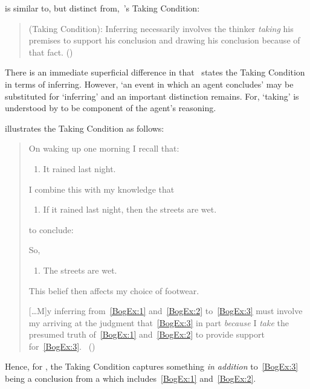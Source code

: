 \begin{note}
 \supportI{} is similar to, but distinct from,~\citeauthor{Boghossian:2014aa}'s Taking Condition:

  \begin{quote}
    (Taking Condition):
    Inferring necessarily involves the thinker \emph{taking} his premises to support his conclusion and drawing his conclusion because of that fact.%
    \mbox{}\hfill\mbox{(\citeyear[5]{Boghossian:2014aa})}
  \end{quote}

  \noindent%
  There is an immediate superficial difference in that~\citeauthor{Boghossian:2014aa} states the Taking Condition in terms of inferring.
  However, `an event in which an agent concludes' may be substituted for `inferring' and an important distinction remains.
  For, `taking' is understood by \citeauthor{Boghossian:2014aa} to be component of the agent's reasoning.

  \citeauthor{Boghossian:2014aa} illustrates the Taking Condition as follows:
  \begin{quote}
    On waking up one morning I recall that:

    \begin{enumerate}[label=(\arabic*), ref=(\arabic*), series=BogEx]
    \item
      \label{BogEx:1}
      It rained last night.
    \end{enumerate}

    I combine this with my knowledge that

    \begin{enumerate}[label=(\arabic*), ref=(\arabic*), resume*=BogEx]
    \item
      \label{BogEx:2}
      If it rained last night, then the streets are wet.
    \end{enumerate}

    to conclude:

    So,

    \begin{enumerate}[label=(\arabic*), ref=(\arabic*), resume*=BogEx]
    \item
      \label{BogEx:3}
      The streets are wet.
    \end{enumerate}
    This belief then affects my choice of footwear.%

    [\dots M]y inferring from~\ref{BogEx:1} and~\ref{BogEx:2} to~\ref{BogEx:3} must involve my arriving at the judgment that~\ref{BogEx:3} in part \emph{because} I \emph{take} the presumed truth of~\ref{BogEx:1} and~\ref{BogEx:2} to provide support for~\ref{BogEx:3}.%
    \mbox{ }\hfill\mbox{(\citeyear[2,4]{Boghossian:2014aa})}
  \end{quote}
  Hence, for \citeauthor{Boghossian:2014aa}, the Taking Condition captures something \emph{in addition} to~\ref{BogEx:3} being a conclusion from a \pool{} which includes~\ref{BogEx:1} and~\ref{BogEx:2}.


\end{note}
